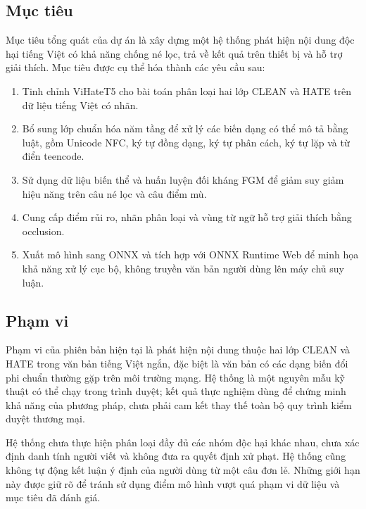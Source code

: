 \documentclass[12pt,a4paper]{article}
\begin{document}
\subsection{Mục tiêu}
Mục tiêu tổng quát của dự án là xây dựng một hệ thống phát hiện nội dung độc hại tiếng Việt có khả năng chống né lọc, trả về kết quả trên thiết bị và hỗ trợ giải thích. Mục tiêu được cụ thể hóa thành các yêu cầu sau:
\begin{enumerate}
  \item Tinh chỉnh ViHateT5 cho bài toán phân loại hai lớp CLEAN và HATE trên dữ liệu tiếng Việt có nhãn.
  \item Bổ sung lớp chuẩn hóa năm tầng để xử lý các biến dạng có thể mô tả bằng luật, gồm Unicode NFC, ký tự đồng dạng, ký tự phân cách, ký tự lặp và từ điển teencode.
  \item Sử dụng dữ liệu biến thể và huấn luyện đối kháng FGM để giảm suy giảm hiệu năng trên câu né lọc và câu điểm mù.
  \item Cung cấp điểm rủi ro, nhãn phân loại và vùng từ ngữ hỗ trợ giải thích bằng occlusion.
  \item Xuất mô hình sang ONNX và tích hợp với ONNX Runtime Web để minh họa khả năng xử lý cục bộ, không truyền văn bản người dùng lên máy chủ suy luận.
\end{enumerate}

\subsection{Phạm vi}
Phạm vi của phiên bản hiện tại là phát hiện nội dung thuộc hai lớp CLEAN và HATE trong văn bản tiếng Việt ngắn, đặc biệt là văn bản có các dạng biến đổi phi chuẩn thường gặp trên môi trường mạng. Hệ thống là một nguyên mẫu kỹ thuật có thể chạy trong trình duyệt; kết quả thực nghiệm dùng để chứng minh khả năng của phương pháp, chưa phải cam kết thay thế toàn bộ quy trình kiểm duyệt thương mại.

Hệ thống chưa thực hiện phân loại đầy đủ các nhóm độc hại khác nhau, chưa xác định danh tính người viết và không đưa ra quyết định xử phạt. Hệ thống cũng không tự động kết luận ý định của người dùng từ một câu đơn lẻ. Những giới hạn này được giữ rõ để tránh sử dụng điểm mô hình vượt quá phạm vi dữ liệu và mục tiêu đã đánh giá.
\end{document}
